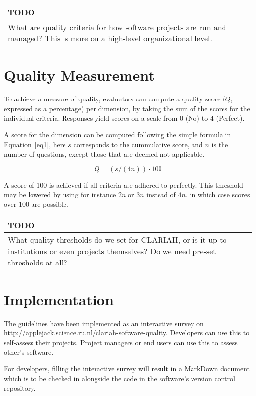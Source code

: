\documentclass[a4paper,11pt]{article}
\newenvironment{TODO}{
\begin{center}
    \begin{tabular}[h!]{|p{0.8\textwidth}|}
    \hline
    {\bf TODO}\\\hline}
{   \\\hline
    \end{tabular}
\end{center}}
\begin{document}
\begin{TODO} 
What are quality criteria for how software projects are run and
managed? This is more on a high-level organizational level.
\end{TODO}


\section{Quality Measurement}

To achieve a measure of quality, evaluators can compute a quality score ($Q$,
expressed as a percentage) per dimension, by taking the sum of the scores for
the individual criteria. Responses yield scores on a scale from 0 (No) to 4 (Perfect). 

A score for the dimension can be computed following the simple formula in
Equation~\ref{eq1}, here $s$ corresponds to the cummulative score, and $n$ is
the number of questions, except those that are deemed not applicable.

\begin{equation}
\label{eq1}
Q = (s / (4n)) \cdot 100
\end{equation}

A score of 100 is achieved if all criteria are adhered to perfectly. This
threshold may be lowered by using for instance $2n$ or $3n$ instead of $4n$, in
which case scores over $100$ are possible.

\begin{TODO}
What quality thresholds do we set for CLARIAH, or is it up
to institutions or even projects themselves? Do we need pre-set thresholds at
all?
\end{TODO}



\section{Implementation}

The guidelines have been implemented as an interactive survey on
\url{http://applejack.science.ru.nl/clariah-software-quality}. Developers can
use this to self-assess their projects. Project managers or end users can use
this to assess other's software.

For developers, filling the interactive survey will result in a
MarkDown document which is to be checked in alongside the code in the
software's version control repository.
\end{document}
